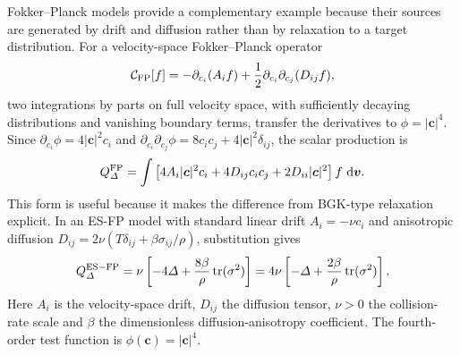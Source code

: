 \documentclass[lineno,paper]{JFM-FLM_Au}
\newenvironment{revision}{\nolinenumbers\begin{tcolorbox}[breakable,colback=revisionyellow,colframe=revisionyellow,boxrule=0pt,arc=0pt,left=5pt,right=5pt,top=5pt,bottom=5pt,before skip=6pt,after skip=6pt]\captionsetup{width=\linewidth}}{\end{tcolorbox}\linenumbers}
\newenvironment{revision}{}{}
\newcommand{\dd}{\mathrm{d}}
\newcommand{\tr}{\operatorname{tr}}
\begin{document}
\begin{revision}
Fokker--Planck models provide a complementary example because their sources are generated by drift and diffusion rather than by relaxation to a target distribution.  For a velocity-space Fokker--Planck operator
\begin{equation}
  \mathcal C_{\rm FP}[f]
  =-\partial_{c_i}(A_i f)+\frac12\partial_{c_i}\partial_{c_j}(D_{ij}f),
  \label{eq:fp_operator}
\end{equation}
two integrations by parts on full velocity space, with sufficiently decaying distributions and vanishing boundary terms, transfer the derivatives to $\phi=|\boldsymbol c|^4$. Since $\partial_{c_i}\phi=4|\boldsymbol c|^2c_i$ and $\partial_{c_i}\partial_{c_j}\phi=8c_ic_j+4|\boldsymbol c|^2\delta_{ij}$, the scalar production is
\begin{equation}
  Q_\Delta^{\rm FP}
  =\int \left[4A_i|\boldsymbol c|^2c_i+4D_{ij}c_i c_j+2D_{ii}|\boldsymbol c|^2\right]f~\dd\boldsymbol v .
  \label{eq:fp_delta_source_general}
\end{equation}
This form is useful because it makes the difference from BGK-type relaxation explicit.  In an ES-FP model with standard linear drift $A_i=-\nu c_i$ and anisotropic diffusion $D_{ij}=2\nu(T\delta_{ij}+\beta\sigma_{ij}/\rho)$, substitution gives
\begin{equation}
  Q_\Delta^{\rm ES-FP}
  =\nu\left[-4\Delta+\frac{8\beta}{\rho}\tr(\sigma^2)\right]
  =4\nu\left[-\Delta+\frac{2\beta}{\rho}\tr(\sigma^2)\right].
  \label{eq:esfp_delta_source}
\end{equation}
Here $A_i$ is the velocity-space drift, $D_{ij}$ the diffusion tensor,
$\nu>0$ the collision-rate scale and $\beta$ the dimensionless
diffusion-anisotropy coefficient. The fourth-order test function is
$\phi(\boldsymbol c)=|\boldsymbol c|^4$.


\end{revision}
\end{document}
